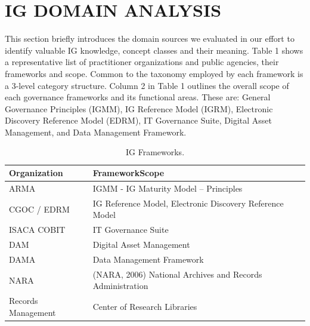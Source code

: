 \documentclass[a4paper,twoside]{article}
\begin{document}
\section{IG DOMAIN ANALYSIS}
\label{sec:domainanalysis}
This section briefly introduces the domain sources we evaluated in our effort to identify valuable IG knowledge, concept classes and their meaning. Table 1 shows a representative list of practitioner organizations and public agencies, their frameworks and scope. Common to the taxonomy employed by each framework is a 3-level category structure. Column 2 in Table 1 outlines the overall scope of each governance frameworks and its functional areas. These are: General Governance Principles (IGMM), IG Reference Model (IGRM), Electronic Discovery Reference Model (EDRM), IT Governance Suite, Digital Asset Management, and Data Management Framework.
\begin{table}[ht]
\caption{IG Frameworks.}
\label{tab:frameworks} \centering
\scalebox{0.55} {\begin{tabular} {|l|l|}
  \hline
  Organization & Framework\/Scope\\
  \hline
  ARMA & {IGMM - IG Maturity Model – Principles}\\
  \hline
  {CGOC / EDRM} & {IG Reference Model, Electronic Discovery Reference Model}\\
  \hline
  {ISACA	COBIT} & {IT Governance Suite} \\
  \hline
  {DAM}	& {Digital Asset Management} \\
  \hline
  {DAMA} 	& {Data Management Framework} \\
  \hline
  {NARA } &  {(NARA, 2006) National Archives and Records Administration} \\
  \hline 
  {Records Management}  & {Center of Research Libraries} \\
  \hline
 \end{tabular}}
\end{table}
%
\end{document}

